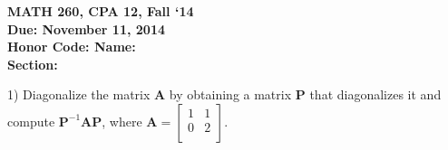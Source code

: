 \documentclass{article}
\begin{document}
\begin{flushleft}
	\bfseries{MATH 260, CPA 12, Fall `14}\\
	\bfseries{Due: November 11, 2014}\\
	\bfseries{Honor Code:} \hspace{3.5in}\bfseries{Name:}\\
	\hspace{4.37in}\bfseries{Section:}
\end{flushleft}
\vspace{.25in}
\begin{flushleft}

1) Diagonalize the matrix $\textbf{A}$ by obtaining a matrix $\textbf{P}$ that diagonalizes it and compute $\textbf{P}^{-1}\textbf{A}\textbf{P}$, where $\textbf{A} = \begin{bmatrix} 1&1 \\ 0&2\\ \end{bmatrix}$.


\end{flushleft}
\end{document}
